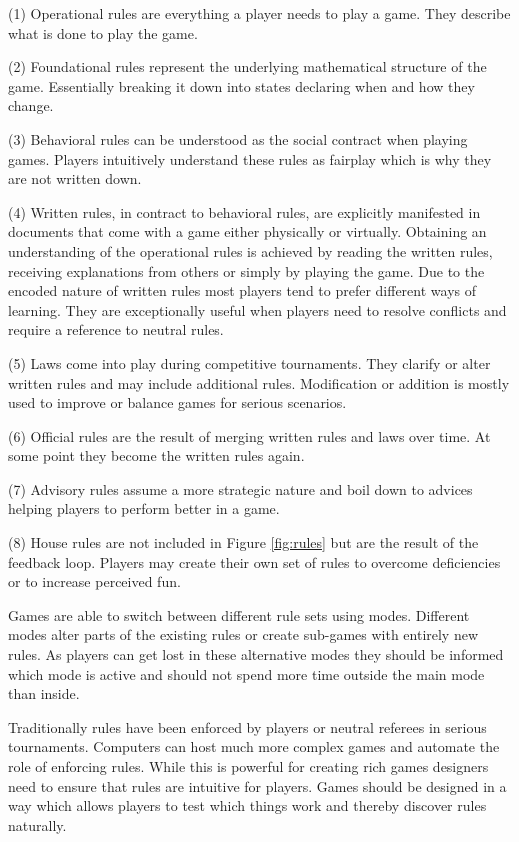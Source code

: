 (1) Operational rules are everything a player needs to play a game.
They describe what is done to play the game.

(2) Foundational rules represent the underlying mathematical structure of the game.
Essentially breaking it down into states declaring when and how they change.


(3) Behavioral rules can be understood as the social contract when playing games.
Players intuitively understand these rules as fairplay which is why they are not written down.

(4) Written rules, in contract to behavioral rules, are explicitly manifested in documents that come with a game either physically or virtually.
Obtaining an understanding of the operational rules is achieved by reading the written rules, receiving explanations from others or simply by playing the game.
Due to the encoded nature of written rules most players tend to prefer different ways of learning.
They are exceptionally useful when players need to resolve conflicts and require a reference to neutral rules.

(5) Laws come into play during competitive tournaments.
They clarify or alter written rules and may include additional rules.
Modification or addition is mostly used to improve or balance games for serious scenarios.

(6) Official rules are the result of merging written rules and laws over time.
At some point they become the written rules again.

(7) Advisory rules assume a more strategic nature and boil down to advices helping players to perform better in a game.

(8) House rules are not included in Figure \ref{fig:rules} but are the result of the feedback loop.
Players may create their own set of rules to overcome deficiencies or to increase perceived fun.

Games are able to switch between different rule sets using modes.
Different modes alter parts of the existing rules or create sub-games with entirely new rules.
As players can get lost in these alternative modes they should be informed which mode is active and should not spend more time outside the main mode than inside.

Traditionally rules have been enforced by players or neutral referees in serious tournaments.
Computers can host much more complex games and automate the role of enforcing rules.
While this is powerful for creating rich games designers need to ensure that rules are intuitive for players.
Games should be designed in a way which allows players to test which things work and thereby discover rules naturally.

